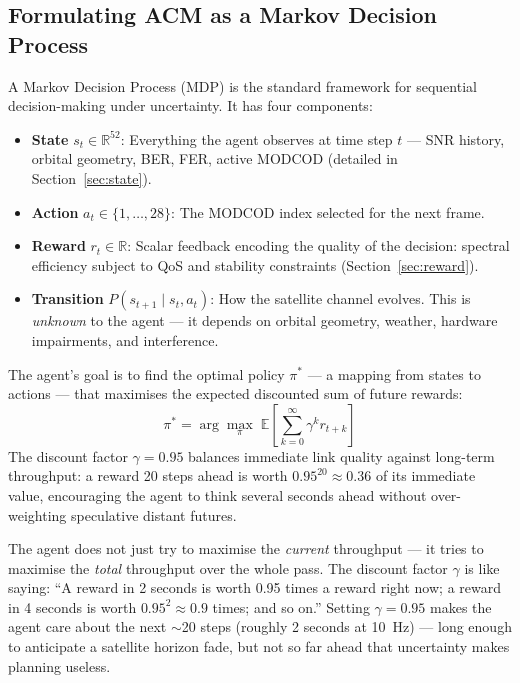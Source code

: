 \documentclass[12pt,a4paper]{report}
\begin{document}
\subsection{Formulating ACM as a Markov Decision Process}

A Markov Decision Process (MDP) is the standard framework for sequential
decision-making under uncertainty. It has four components:
\begin{itemize}
    \item \textbf{State} $s_t \in \mathbb{R}^{52}$: Everything the agent
          observes at time step $t$ --- SNR history, orbital geometry, BER,
          FER, active MODCOD (detailed in Section~\ref{sec:state}).
    \item \textbf{Action} $a_t \in \{1, \ldots, 28\}$: The MODCOD index
          selected for the next frame.
    \item \textbf{Reward} $r_t \in \mathbb{R}$: Scalar feedback encoding
          the quality of the decision: spectral efficiency subject to QoS
          and stability constraints (Section~\ref{sec:reward}).
    \item \textbf{Transition} $P(s_{t+1} \mid s_t, a_t)$: How the satellite
          channel evolves. This is \emph{unknown} to the agent --- it depends
          on orbital geometry, weather, hardware impairments, and interference.
\end{itemize}

The agent's goal is to find the optimal policy $\pi^*$ --- a mapping from
states to actions --- that maximises the expected discounted sum of future
rewards:
\begin{equation}
    \pi^* = \arg\max_\pi\; \mathbb{E}\!\left[\sum_{k=0}^{\infty} \gamma^k r_{t+k}\right]
\end{equation}
The discount factor $\gamma = 0.95$ balances immediate link quality against
long-term throughput: a reward 20 steps ahead is worth $0.95^{20} \approx
0.36$ of its immediate value, encouraging the agent to think several seconds
ahead without over-weighting speculative distant futures.

\begin{plainenglish}
The agent does not just try to maximise the \emph{current} throughput ---
it tries to maximise the \emph{total} throughput over the whole pass.
The discount factor $\gamma$ is like saying: ``A reward in 2 seconds is worth
0.95 times a reward right now; a reward in 4 seconds is worth $0.95^2 \approx 0.9$
times; and so on.''  Setting $\gamma = 0.95$ makes the agent care about the next
$\sim$20 steps (roughly 2 seconds at 10~Hz) --- long enough to anticipate a
satellite horizon fade, but not so far ahead that uncertainty makes planning useless.
\end{plainenglish}
\end{document}
